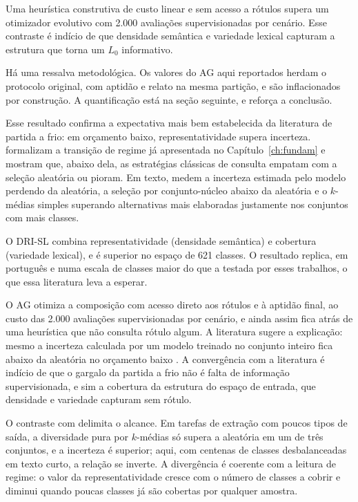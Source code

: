 Uma heurística construtiva de custo linear e sem acesso a rótulos supera um
otimizador evolutivo com 2.000 avaliações supervisionadas por cenário. Esse
contraste é indício de que densidade semântica e variedade lexical capturam a
estrutura que torna um $L_0$ informativo.

Há uma ressalva metodológica. Os valores do AG aqui reportados herdam o
protocolo original, com aptidão e relato na mesma partição, e são
inflacionados por construção. A quantificação está na seção seguinte, e reforça a conclusão.

Esse resultado confirma a expectativa mais bem estabelecida da literatura de
partida a frio: em orçamento baixo, representatividade supera incerteza.
\citet{Hacohen2022TypiClust} formalizam a transição de regime já apresentada
no Capítulo~\ref{ch:fundam} e mostram que, abaixo dela, as estratégias
clássicas de consulta empatam com a seleção aleatória ou pioram. Em texto,
\citet{Yu2023Patron} medem a incerteza estimada pelo modelo perdendo da
aleatória, a seleção por conjunto-núcleo abaixo da aleatória e o $k$-médias
simples superando alternativas mais elaboradas justamente nos conjuntos com
mais classes.

O DRI-SL combina representatividade (densidade semântica) e cobertura
(variedade lexical), e é superior no espaço de 621 classes. O resultado replica,
em português e numa escala de classes maior do que a testada por esses
trabalhos, o que essa literatura leva a esperar.

O AG otimiza a composição com acesso direto aos rótulos e à aptidão final,
ao custo das 2.000 avaliações supervisionadas por cenário, e ainda assim
fica atrás de uma heurística que não consulta rótulo algum. A literatura sugere
a explicação: mesmo a incerteza calculada por um modelo treinado no conjunto
inteiro fica abaixo da aleatória no orçamento baixo
\citep{Hacohen2022TypiClust}. A convergência com a literatura é indício de que
o gargalo da partida a frio não é falta de informação
supervisionada, e sim a cobertura da estrutura do espaço de entrada, que
densidade e variedade capturam sem rótulo.

O contraste com \citet{Zhang2023LLMaAA} delimita o alcance. Em tarefas de
extração com poucos tipos de saída, a diversidade pura por $k$-médias só
supera a aleatória em um de três conjuntos, e a incerteza é superior; aqui, com
centenas de classes desbalanceadas em texto curto, a relação se inverte. A divergência é coerente
com a leitura de regime: o valor da representatividade cresce com o número de
classes a cobrir e diminui quando poucas classes já são cobertas por
qualquer amostra.

